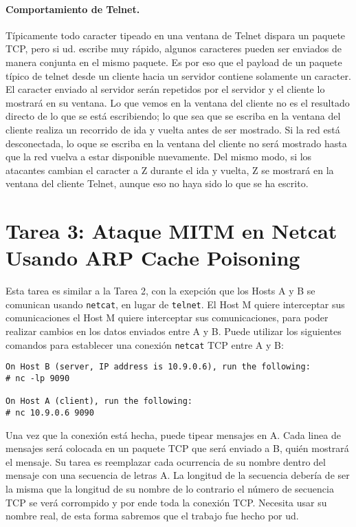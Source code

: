 \paragraph{Comportamiento de Telnet.}
Típicamente todo caracter tipeado en una ventana de Telnet dispara un paquete TCP, pero si ud. escribe muy rápido, algunos caracteres pueden ser enviados de manera conjunta en el mismo paquete.
Es por eso que el payload de un paquete típico de telnet desde un cliente hacia un servidor contiene solamente un caracter. El caracter enviado al servidor serán repetidos por el servidor y el cliente lo mostrará en su ventana. 
Lo que vemos en la ventana del cliente no es el resultado directo de lo que se está escribiendo; lo que sea que se escriba en la ventana del cliente realiza un recorrido de ida y vuelta antes de ser mostrado.
Si la red está desconectada, lo oque se escriba en la ventana del cliente no será mostrado hasta que la red vuelva a estar disponible nuevamente. 
Del mismo modo, si los atacantes cambian el caracter a Z durante el ida y vuelta, Z se mostrará en la ventana del cliente Telnet, aunque eso no haya sido lo que se ha escrito.


\section{Tarea 3: Ataque MITM en Netcat Usando ARP Cache Poisoning}

Esta tarea es similar a la Tarea 2, con la exepción que los Hosts A y B se comunican usando \texttt{netcat}, en lugar de \texttt{telnet}.
El Host M quiere interceptar sus comunicaciones el Host M quiere interceptar sus comunicaciones, para poder realizar cambios en los datos enviados entre A y B.
Puede utilizar los siguientes comandos para establecer una conexión \texttt{netcat} TCP entre A y B:


\begin{lstlisting}
On Host B (server, IP address is 10.9.0.6), run the following:
# nc -lp 9090

On Host A (client), run the following:
# nc 10.9.0.6 9090
\end{lstlisting}
 
Una vez que la conexión está hecha, puede tipear mensajes en A.
Cada linea de mensajes será colocada en un paquete TCP que será enviado a B, quién mostrará el mensaje.
Su tarea es reemplazar cada ocurrencia de su nombre dentro del mensaje con una secuencia de letras A. La longitud de la secuencia debería de ser la misma que la longitud de su nombre de lo contrario el número de secuencia TCP se verá corrompido y por ende toda la conexión TCP. Necesita usar su nombre real, de esta forma sabremos que el trabajo fue hecho por ud.


